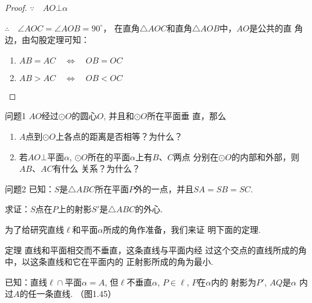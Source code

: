\begin{figure}[htp]
  \centering
{}
  \caption{}
\end{figure}


\begin{proof}
$\because\quad AO\bot\alpha$

$\therefore \quad \angle AOC=\angle AOB=90^{\circ}$，
在直角$\triangle AOC$和直角$\triangle AOB$中，$AO$是公共的直
角边，由勾股定理可知：
\begin{enumerate}
  \item $AB=AC\quad \Longleftrightarrow \quad OB=OC$
  \item $AB>AC\quad \Longleftrightarrow \quad OB<OC$
\end{enumerate}
\end{proof}

\begin{blk}
  {问题1} $AO$经过$\odot O$的圆心$O$, 并且和$\odot O$所在平面垂
直，那么
\begin{enumerate}
  \item $A$点到$\odot O$上各点的距离是否相等？为什么？
  \item 若$AO\bot$平面$\alpha$, $\odot O$所在的平面$\alpha$上有$B$、$C$两点
分别在$\odot O$的内部和外部，则$AB$、$AC$有什么
关系？为什么？
\end{enumerate}
\end{blk}


\begin{blk}
  {问题2} 已知：$S$是$\triangle ABC$所在平面$P$外的一点，并且$SA
=SB=SC$.

\noindent 求证：$S$点在$P$上的射影$S'$是$\triangle ABC$的外心. 
\end{blk}

为了给研究直线$\ell$和平面$\alpha$所成的角作准备，我们来证
明下面的定理. 

\begin{blk}
  {定理} 直线和平面相交而不垂直，这条直线与平面内经
过这个交点的直线所成的角中，以这条直线和它在平面内的
正射影所成的角为最小. 
\end{blk}

已知：直线$\ell\cap$平面$\alpha=A$, 但$\ell$不垂直$\alpha$, $P\in\ell$, $P$在$\alpha$内的
射影为$P'$, $AQ$是$\alpha$
内过$A$的任一条直线. （图1.45）

